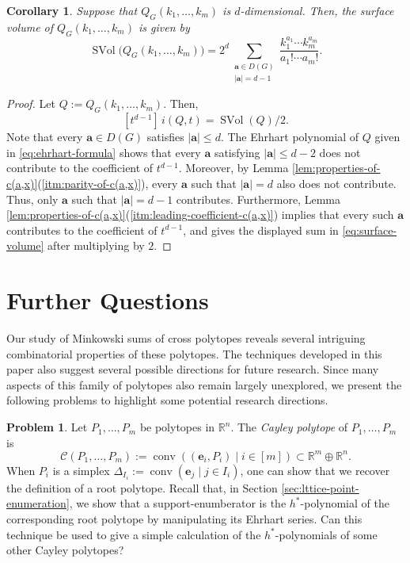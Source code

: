 \documentclass[11pt,a4paper]{article}
\newcommand{\vct}[1]{\boldsymbol{#1}}
\newcommand{\R}{\mathbb{R}}
\newcommand{\conv}{\operatorname{conv}}
\newcommand{\SVol}{\operatorname{SVol}}
\newcommand{\1}{\mathbf{1}}
\theoremstyle{plain}
\newtheorem{corollary}[theorem]{Corollary}
\theoremstyle{definition}
\newtheorem{problem}[theorem]{Problem}
\begin{document}
\begin{corollary}
Suppose that $Q_G(k_1,\ldots,k_m)$ is $d$-dimensional. Then, the surface volume of $Q_G(k_1,\ldots,k_m)$ is given by
\begin{equation}
\SVol\bigl(Q_G(k_1,\ldots,k_m)\bigr)
=2^d\sum_{\substack{\vct{a}\in D(G)\\|\vct{a}|=d-1}}
\frac{k_1^{a_1}\cdots k_m^{a_m}}{a_1!\cdots a_m!}.
\label{eq:surface-volume}
\end{equation}
\end{corollary}
\begin{proof}
Let $Q:=Q_G(k_1,\ldots,k_m)$. Then,
\[
[t^{d-1}]\,i(Q,t)=\SVol(Q)/2.
\]
Note that every $\vct{a} \in D(G)$ satisfies $|\vct{a}| \leq d$. The Ehrhart polynomial of $Q$ given in \eqref{eq:ehrhart-formula} shows that every $\vct{a}$ satisfying $|\vct{a}|\le d-2$ does not contribute to the coefficient of $t^{d-1}$. Moreover, by Lemma \ref{lem:properties-of-c(a,x)}(\ref{itm:parity-of-c(a,x)}), every $\vct{a}$ such that $|\vct{a}|=d$ also does not contribute. Thus, only $\vct{a}$ such that $|\vct{a}|=d-1$ contributes. Furthermore, Lemma \ref{lem:properties-of-c(a,x)}(\ref{itm:leading-coefficient-c(a,x)}) implies that every such $\vct{a}$ contributes to the coefficient of $t^{d-1}$, and gives the displayed sum in \eqref{eq:surface-volume} after multiplying by $2$.
\end{proof}

\section{Further Questions}\label{sec:further-questions}
Our study of Minkowski sums of cross polytopes reveals several intriguing combinatorial properties of these polytopes. The techniques developed in this paper also suggest several possible directions for future research. Since many aspects of this family of polytopes also remain largely unexplored, we present the following problems to highlight some potential research directions.

\begin{problem}
Let $P_1,\dots, P_m$ be polytopes in $\R^n$. The \emph{Cayley polytope} of $P_1,\dots,P_m$ is 
\[\mathcal{C}(P_1,\dots, P_m):=\conv( (\vct{e}_i,P_i)\mid i \in [m]) \subset \R^{m}\oplus\R^n.\]
When $P_i$ is a simplex $\Delta_{I_i} :=\conv(\vct{e}_j\mid j \in I_i)$, one can show that we recover the definition of a root polytope. Recall that, in Section \ref{sec:lttice-point-enumeration}, we show that a support-enumberator is the $h^*$-polynomial of the corresponding root polytope by manipulating its Ehrhart series. Can this technique be used to give a simple calculation of the $h^*$-polynomials of some other Cayley polytopes?
\end{problem}
\end{document}
